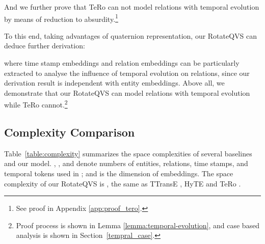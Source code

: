 \documentclass[11pt]{article}
\begin{document}
And we further prove that TeRo can not model relations with temporal evolution by means of reduction to absurdity.\footnote{See proof in Appendix \ref{app:proof_tero}.}

To this end, taking advantages of quaternion representation, our RotateQVS can deduce further derivation:

where time stamp embeddings and relation embeddings can be particularly extracted to analyse the influence of temporal evolution on relations, since our derivation result is independent with entity embeddings.
Above all, we demonstrate that our RotateQVS can model relations with temporal evolution while TeRo cannot.\footnote{Proof process is shown in Lemma \ref{lemma:temporal-evolution}, and case based analysis is shown in Section~\ref{tempral_case}.}

\subsection{Complexity Comparison}
\label{app:complexity_comparison}


Table~\ref{table:complexity} summarizes the space complexities of several baselines and our model.
, ,  and  denote numbers of entities, relations, time stamps, and temporal tokens used in \cite{garcia2018learning}; and  is the dimension of embeddings.
The space complexity of our RotateQVS is , the same as TTransE \cite{leblay2018deriving}, HyTE \cite{dasgupta2018hyte} and TeRo \cite{xu2020tero}.



\begin{table}[!t]
\centering
{}
\caption{Statistics of four experimented datasets.}
\label{table:datasets}
\end{table}
\end{document}
